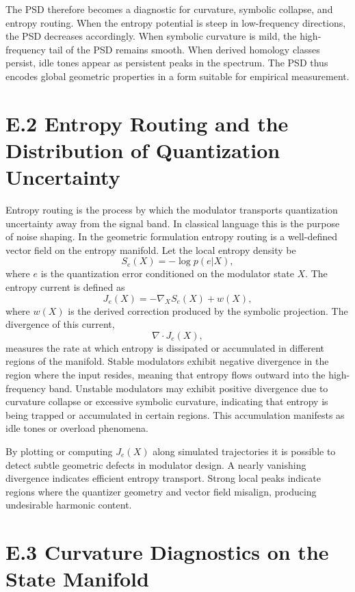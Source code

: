 The PSD therefore becomes a diagnostic for curvature, symbolic collapse, and entropy routing. When the entropy potential is steep in low-frequency directions, the PSD decreases accordingly. When symbolic curvature is mild, the high-frequency tail of the PSD remains smooth. When derived homology classes persist, idle tones appear as persistent peaks in the spectrum. The PSD thus encodes global geometric properties in a form suitable for empirical measurement.

\section{E.2 Entropy Routing and the Distribution of Quantization Uncertainty}

Entropy routing is the process by which the modulator transports quantization uncertainty away from the signal band. In classical language this is the purpose of noise shaping. In the geometric formulation entropy routing is a well-defined vector field on the entropy manifold. Let the local entropy density be
\[
S_{e}(X) = -\log p(e|X),
\]
where \(e\) is the quantization error conditioned on the modulator state \(X\). The entropy current is defined as
\[
J_{e}(X) = -\nabla_{X} S_{e}(X) + w(X),
\]
where \(w(X)\) is the derived correction produced by the symbolic projection. The divergence of this current,
\[
\nabla\cdot J_{e}(X),
\]
measures the rate at which entropy is dissipated or accumulated in different regions of the manifold. Stable modulators exhibit negative divergence in the region where the input resides, meaning that entropy flows outward into the high-frequency band. Unstable modulators may exhibit positive divergence due to curvature collapse or excessive symbolic curvature, indicating that entropy is being trapped or accumulated in certain regions. This accumulation manifests as idle tones or overload phenomena.

By plotting or computing \(J_{e}(X)\) along simulated trajectories it is possible to detect subtle geometric defects in modulator design. A nearly vanishing divergence indicates efficient entropy transport. Strong local peaks indicate regions where the quantizer geometry and vector field misalign, producing undesirable harmonic content.

\section{E.3 Curvature Diagnostics on the State Manifold}

